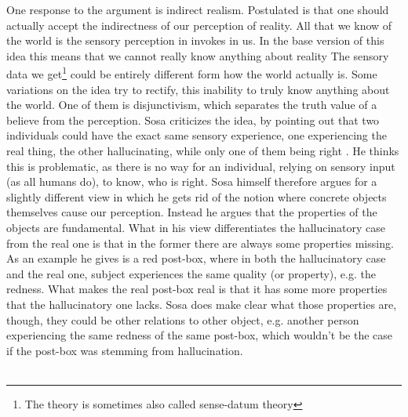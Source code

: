 \documentclass[fleqn,14pt]{article}
\begin{document}
One response to the argument is indirect realism. Postulated is that one should actually accept the indirectness
of our perception of reality. All that we know of the world is the sensory perception in invokes in us. In the
base version of this idea this means that we cannot really know anything about reality\cite[p.71ff]{pritchard} The sensory data we
get\footnote{The theory is sometimes also called sense-datum theory} could be entirely different form how the
world actually is. Some variations on the idea try to rectify, this inability to truly know anything about
the world. One of them is disjunctivism, which separates the truth value of a believe from the perception. 
Sosa criticizes the idea, by pointing out that two individuals could have the exact same sensory experience,
one experiencing the real thing, the other hallucinating, while only one of them being right
\cite[p.299ff]{sosa}. He thinks this is problematic, as there is no way for an individual, relying on sensory
input (as all humans do), to know, who is right. Sosa himself therefore argues for a slightly different
view in which he gets rid of the notion where concrete objects themselves cause our 
perception\cite[p.301ff]{sosa}. Instead he
argues that the properties of the objects are fundamental. What in his view differentiates the hallucinatory
case from the real one is that in the former there are always some properties missing. As an example he gives
is a red post-box, where in both the hallucinatory case and the real one, subject experiences the same quality
(or property), e.g. the redness. What makes the real post-box real is that it has some more properties that
the hallucinatory one lacks. Sosa does make clear what those properties are, though, they could be other relations
to other object, e.g. another person experiencing the same redness of the same post-box, which wouldn't be the
case if the post-box was stemming from hallucination.\\
\\
\end{document}
